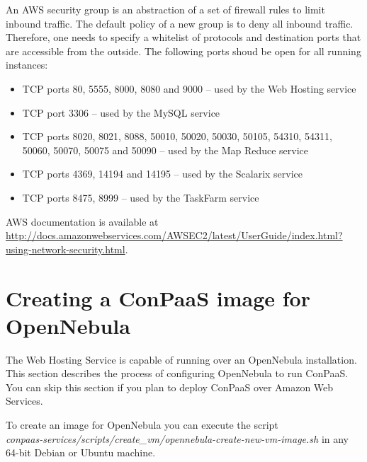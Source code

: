 \documentclass[10pt]{article}
\begin{document}
An AWS security group is an abstraction of a set of firewall rules to
limit inbound traffic. The default policy of a new group is to deny
all inbound traffic. Therefore, one needs to specify a whitelist of
protocols and destination ports that are accessible from the outside. 
The following ports shoud be open for all running instances: 
\begin{itemize}
\item TCP ports 80, 5555, 8000, 8080 and 9000 -- used by the Web Hosting service
\item TCP port 3306 -- used by the MySQL service
\item TCP ports 8020, 8021, 8088, 50010, 50020, 50030, 50105, 54310, 54311, 50060, 50070, 50075 and 50090 -- used by the Map Reduce service
\item TCP ports 4369, 14194 and 14195 -- used by the Scalarix service
\item TCP ports 8475, 8999 -- used by the TaskFarm service
\end{itemize}

AWS documentation is available at
\url{http://docs.amazonwebservices.com/AWSEC2/latest/UserGuide/index.html?using-network-security.html}.

\section{Creating a ConPaaS image for OpenNebula}
\label{sec:oneimage}

The Web Hosting Service is capable of running over an OpenNebula
installation. This section describes the process of configuring
OpenNebula to run ConPaaS. You can skip this section if you plan to
deploy ConPaaS over Amazon Web Services.

To create an image for OpenNebula you can execute the script\\
\textit{conpaas-services/scripts/create\_vm/opennebula-create-new-vm-image.sh} in any
64-bit Debian or Ubuntu machine.
\end{document}
